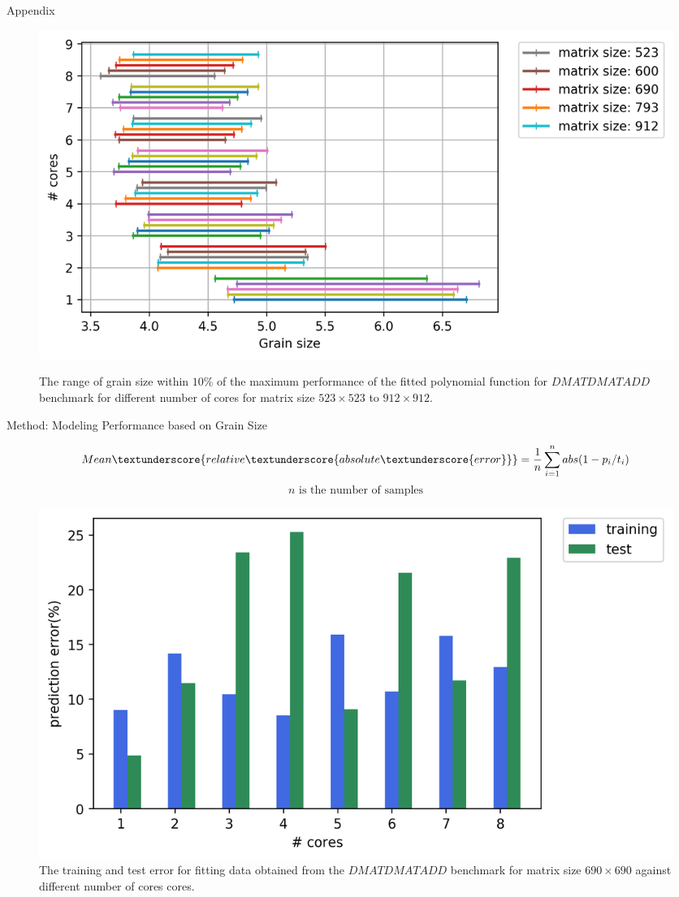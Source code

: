 \documentclass[10pt]{beamer}
\begin{document}
\begin{frame}{Appendix}
	\begin{outline}	
		\begin{figure}[H]
			\includegraphics[scale=.5]{images/polyfit/fig_523-912_peak_range_all.png} \label{fig27}	\caption{The range of grain size within $10\%$ of the maximum performance of the fitted polynomial function for $DMATDMATADD$ benchmark for different number of cores for matrix size $523\times523$ to $912\times912$.}		
		\end{figure} 
	\end{outline}
\end{frame}



\begin{frame}{Method: Modeling Performance based on Grain Size}
	\begin{outline}	
		$$Mean\textunderscore{relative\textunderscore{absolute\textunderscore{error}}} = \frac{1}{n}\sum_{i=1}^{n} abs({1-p_i/t_i})$$
		$$n \text{ is the number of samples}$$
		\begin{figure}[H]
			\centering
			\includegraphics[scale=.5]{images/polyfit/fig_train_test_690.png}
			\caption{The training and test error for fitting data obtained from the $DMATDMATADD$ benchmark for matrix size $690\times690$ against different number of cores cores.}	
			\label{fig11}
		\end{figure}
	\end{outline}
\end{frame}
\end{document}
